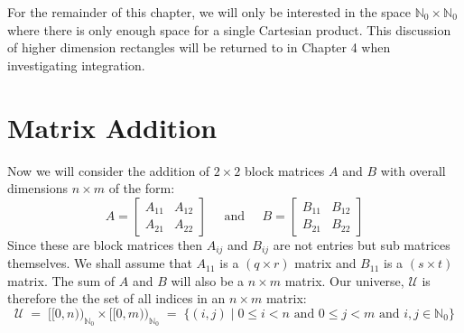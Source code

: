 For the remainder of this chapter, we will only be interested in the space $\mathbb{N}_0 \times \mathbb{N}_0$ where 
there is only enough space for a single Cartesian product.
This discussion of higher dimension rectangles will be returned to in Chapter 4 when investigating integration.



\section{Matrix Addition}


Now we will consider the addition of $2 \times 2$ block matrices $A$ and $B$ with overall dimensions $n \times m$ 
of the form:
\begin{equation*}
	A = \left[ \begin{array}{c|c} A_{11} & A_{12} \\ \hline A_{21} & A_{22} \end{array} \right]
	\;\;\;\;\; \text{and} \;\;\;\;\;
	B = \left[ \begin{array}{c|c} B_{11} & B_{12} \\ \hline B_{21} & B_{22} \end{array} \right]
\end{equation*}
Since these are block matrices then $A_{ij}$ and $B_{ij}$ are not entries but sub matrices themselves.
We shall assume that $A_{11}$ is a $(q \times r)$ matrix and $B_{11}$ is a $(s \times t)$ matrix.
The sum of $A$ and $B$ will also be a $n \times m$ matrix.
Our universe, $\mathcal{U}$ is therefore the the set of all indices in an $n \times m$ matrix:
\begin{equation*}
	\mathcal{U} 
		\;=\; [\![0,n)\!)_{\mathbb{N}_0} \times [\![0,m)\!)_{\mathbb{N}_0} 
		\;=\; \{ (i,j) \;|\; 0 \leq i < n \text{ and } 0 \leq j < m \text{ and } i,j \in \mathbb{N}_0 \} 
\end{equation*}


